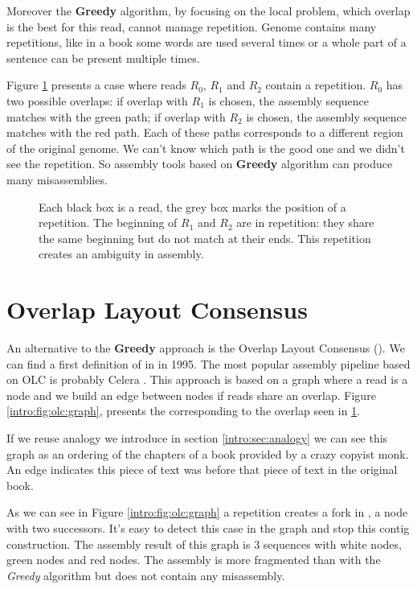 \documentclass[main]{subfiles}
\begin{document}
Moreover the \textbf{Greedy} algorithm, by focusing on the local problem, which overlap is the best for this read, cannot manage repetition. Genome contains many repetitions, like in a book some words are used several times or a whole part of a sentence can be present multiple times.

Figure \ref{intro:fig:greedy:repetition} presents a case where reads $R_0$, $R_1$ and $R_2$ contain a repetition. $R_0$ has two possible overlaps: if overlap with $R_1$ is chosen, the assembly sequence matches with the green path; if overlap with $R_2$ is chosen, the assembly sequence matches with the red path. Each of these paths corresponds to a different region of the original genome. We can't know which path is the good one and we didn't see the repetition. So assembly tools based on \textbf{Greedy} algorithm can produce many misassemblies. 

\begin{figure}[ht]
    \centering 
    
    \caption{Each black box is a read, the grey box marks the position of a repetition. The beginning of $R_1$ and $R_2$ are in repetition: they share the same beginning but do not match at their ends. This repetition creates an ambiguity in assembly.}
    \label{intro:fig:greedy:repetition}
\end{figure}

\section{Overlap Layout Consensus} \label{intro:subsec:OLC}

An alternative to the \textbf{Greedy} approach is the Overlap Layout Consensus (\OLC). We can find a first definition of \OLC in \cite{OLC_myers} in 1995. The most popular assembly pipeline based on OLC is probably Celera \cite{celera_first, celera_second}. This approach is based on a graph where a read is a node and we build an edge between nodes if reads share an overlap. Figure \ref{intro:fig:olc:graph}, presents the \OLC corresponding to the overlap seen in \ref{intro:fig:greedy:repetition}.

If we reuse analogy we introduce in section \ref{intro:sec:analogy} we can see this graph as an ordering of the chapters of a book provided by a crazy copyist monk. An edge indicates this piece of text was before that piece of text in the original book.

As we can see in Figure \ref{intro:fig:olc:graph} a repetition creates a fork in \OLC, a node with two successors. It's easy to detect this case in the graph and stop this contig construction. The assembly result of this graph is 3 sequences with white nodes, green nodes and red nodes. The assembly is more fragmented than with the \textit{Greedy} algorithm but does not contain any misassembly.
\end{document}
